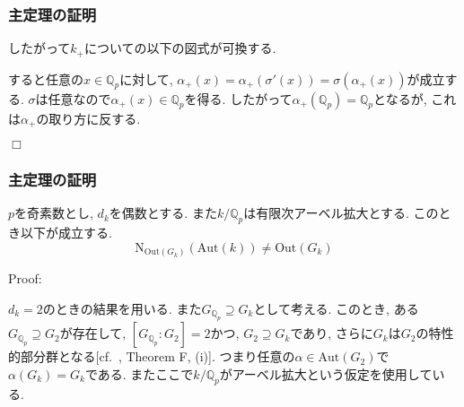 \documentclass[dvipdfmx,19.8pt]{beamer}
\newcommand{\Blue}{\color{blue}}
\def\qed{\hfill $\Box$}
\theoremstyle{theorem}
\theoremstyle{definition}
\def\bQ{{\mathbb Q}}
\def\Aut{{\mathrm{Aut}}}
\def\Out{{\mathrm{Out}}}
\begin{document}
\begin{frame}[fragile]
	\frametitle{主定理の証明}

したがって$k_+$についての以下の図式が可換する. 
\begin{center}
\end{center}

すると任意の$x \in \bQ_p$に対して, $\alpha_+(x) = \alpha_+(\sigma'(x)) = \sigma(\alpha_+(x))$が成立する. 
$\sigma$は任意なので$\alpha_+(x) \in \bQ_p$を得る. したがって$\alpha_+(\bQ_p) = \bQ_p$となるが, これは$\alpha_+$の取り方に反する. 

\qed


\end{frame}





\begin{frame}[fragile]
	\frametitle{主定理の証明}

\begin{theorem}\label{main:theorem:even}
$p$を奇素数とし, $d_k$を偶数とする. また$k/\bQ_p$は有限次アーベル拡大とする. このとき以下が成立する. 
\[
\mathrm{N}_{\Out(G_k)}(\Aut(k)) \neq \Out(G_k)
\]
\end{theorem}
{\Blue Proof:}


$d_k=2$のときの結果を用いる. また$G_{\bQ_p} \supseteq G_k$として考える. このとき, ある$G_{\bQ_p} \supseteq G_2$が存在して, $[G_{\bQ_p}:G_2]=2$かつ, $G_2 \supseteq G_k$であり, さらに$G_k$は$G_2$の特性的部分群となる[cf.\ \cite{Hoshi2}, Theorem F, (i)]. つまり任意の$\alpha \in \Aut(G_2)$で$\alpha(G_k) = G_k$である. またここで$k/\bQ_p$がアーベル拡大という仮定を使用している.  


\end{frame}
\end{document}
